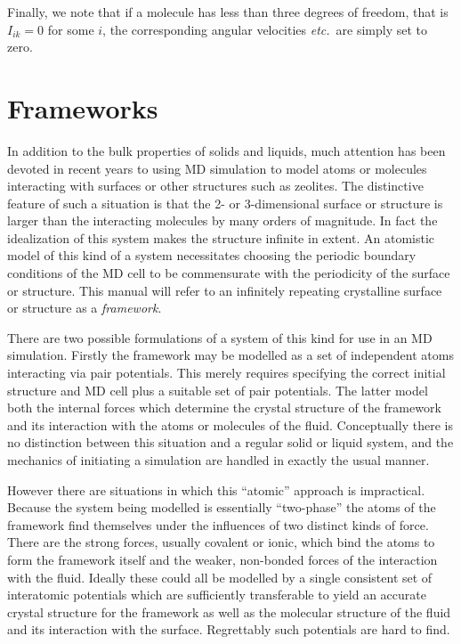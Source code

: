 \documentclass[a4paper,twoside]{report}
\newcommand{\etc}{\emph{etc.}}
\begin{document}
Finally, we note that if a molecule has less than three degrees of
freedom, that is $I_{ik}=0$ for some $i$, the corresponding angular
velocities \etc\ are simply set to zero.

\section{Frameworks}%
\label{sec:frameworks}
In addition to the bulk properties of solids and liquids, much
attention has been devoted in recent years to using MD simulation to
model atoms or molecules interacting with surfaces or other structures
such as zeolites.  The distinctive feature of such a situation is that
the 2- or 3-dimensional surface or structure is larger than the
interacting molecules by many orders of magnitude.  In fact the
idealization of this system makes the structure infinite in extent.
An atomistic model of this kind of a system necessitates choosing the
periodic boundary conditions of the MD cell to be commensurate with
the periodicity of the surface or structure.  This manual will refer
to an infinitely repeating crystalline surface or structure as a
\emph{framework}.

There are two possible formulations of a system of this kind for use
in an MD simulation.  Firstly the framework may be modelled as a set of
independent atoms interacting via pair potentials.  This merely
requires specifying the correct initial structure and MD cell plus a
suitable set of pair potentials. The latter model both the internal
forces which determine the crystal structure of the framework and its
interaction with the atoms or molecules of the fluid.  Conceptually
there is no distinction between this situation and a regular solid or
liquid system, and the mechanics of initiating a simulation are
handled in exactly the usual manner.

However there are situations in which this ``atomic'' approach is
impractical.  Because the system being modelled is essentially
``two-phase'' the atoms of the framework find themselves under the
influences of two distinct kinds of force.  There are the strong
forces, usually covalent or ionic, which bind the atoms to form the
framework itself and the weaker, non-bonded forces of the interaction
with the fluid.  Ideally these could all be modelled by a single
consistent set of interatomic potentials which are sufficiently
transferable to yield an accurate crystal structure for the framework
as well as the molecular structure of the fluid and its interaction
with the surface.  Regrettably such potentials are hard to find.
\end{document}
